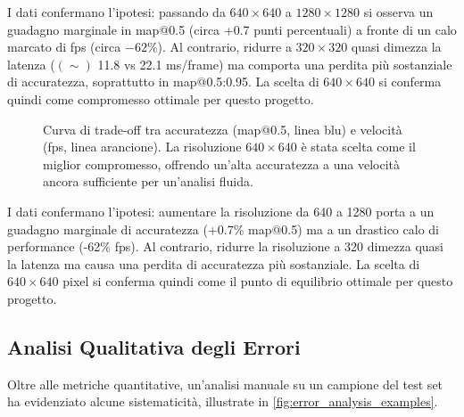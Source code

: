 \documentclass[12pt,a4paper,openright,twoside]{book}
\begin{document}
I dati confermano l'ipotesi: passando da $640\times640$ a $1280\times1280$ si osserva un guadagno marginale in 
\ac{map}@0.5 (circa +0.7 punti percentuali) a fronte di un calo marcato di \ac{fps} (circa $-62\%$). 
Al contrario, ridurre a $320\times320$ quasi dimezza la latenza ($(\sim)$ 11.8 vs 22.1 ms/frame) 
ma comporta una perdita più sostanziale di accuratezza, soprattutto in \ac{map}@0.5:0.95. 
La scelta di $640\times640$ si conferma quindi come compromesso ottimale per questo progetto.



\begin{table}[h]
  \centering
  \caption{Performance del detector al variare della risoluzione di input. L'accuratezza (\ac{map}) cresce con la risoluzione, 
  a discapito della velocità (\ac{fps}).}
  \label{tab:ablation_resolution}
\end{table}

\begin{figure}[h]
  \centering
  \caption{Curva di trade-off tra accuratezza (\ac{map}@0.5, linea blu) e velocità (\ac{fps}, linea arancione).
  La risoluzione $640\times640$ è stata scelta come il miglior compromesso, offrendo un'alta accuratezza a una velocità ancora 
  sufficiente per un'analisi fluida.}
  \label{fig:ablation_resolution_plot}
\end{figure}

I dati confermano l'ipotesi: aumentare la risoluzione da 640 a 1280 porta a un guadagno marginale di accuratezza
(+0.7\% \ac{map}@0.5) ma a un drastico calo di performance (-62\% \ac{fps}). 
Al contrario, ridurre la risoluzione a 320 dimezza quasi la latenza ma causa una perdita di accuratezza più sostanziale. 
La scelta di $640\times640$ pixel si conferma quindi come il punto di equilibrio ottimale per questo progetto.

\subsection{Analisi Qualitativa degli Errori}
Oltre alle metriche quantitative, un'analisi manuale su un campione del test set ha evidenziato alcune sistematicità, 
illustrate in \autoref{fig:error_analysis_examples}.
\end{document}
